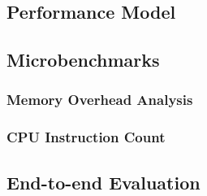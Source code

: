 \documentclass[../../main.tex]{subfiles}
\begin{document}
\subsection{Performance Model}

\subsection{Microbenchmarks}
\subsubsection{Memory Overhead Analysis}

\subsubsection{CPU Instruction Count}

\subsection{End-to-end Evaluation}

\end{document}
